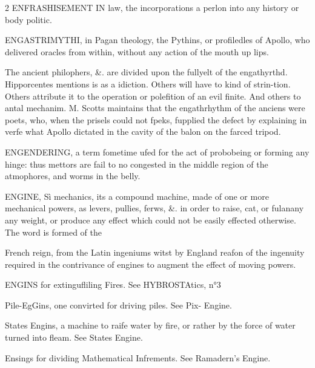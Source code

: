 \documentclass[10pt]{article}
\begin{document}
\begin{multicols}{2}
ENFRASHISEMENT IN law, the incorporations a perlon into any history or body politic.

ENGASTRIMYTHI, in Pagan theology, the Pythins, or profiledles of Apollo, who delivered oracles from within, without any action of the mouth up lips.

The ancient philophers, \&. are divided upon the fullyelt of the engathyrthd. Hipporcentes mentions is as a idiction. Others will have to kind of strin-tion. Others attribute it to the operation or polefition of an evil finite. And others to antal mechanim. M. Scotts maintains that the engathrhythm of the anciens were poets, who, when the prisels could not fpeks, fupplied the defect by explaining in verfe what Apollo dictated in the cavity of the balon on the farced tripod.

ENGENDERING, a term fometime ufed for the act of probobeing or forming any hinge: thus mettors are fail to no congested in the middle region of the atmophores, and worms in the belly.

ENGINE, Sì mechanics, its a compound machine, made of one or more mechanical powers, as levers, pullies, ferws, \&. in order to raise, cat, or fulanany any weight, or produce any effect which could not be easily effected otherwise. The word is formed of the

French reign, from the Latin ingeniums witst by England reafon of the ingenuity required in the contrivance of engines to augment the effect of moving powers.

ENGINS for extingufliling Fires. See HYBROSTAtics, n°3

Pile-EgGins, one convirted for driving piles. See Pix- Engine.

States Engins, a machine to raife water by fire, or rather by the force of water turned into fleam. See States Engine.

Ensings for dividing Mathematical Infrements. See Ramadern’s Engine.


\end{multicols}
\end{document}
